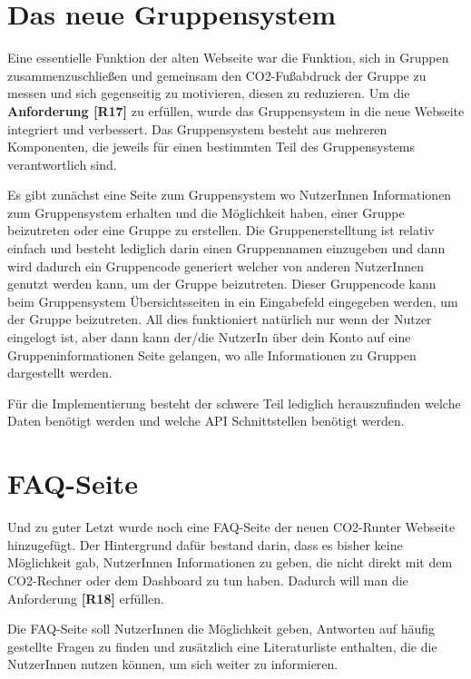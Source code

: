 \section{Das neue Gruppensystem}

Eine essentielle Funktion der alten Webseite war die Funktion, sich in Gruppen zusammenzuschließen und gemeinsam den CO2-Fußabdruck der Gruppe zu messen und sich gegenseitig zu motivieren, diesen zu reduzieren. Um die \textbf{Anforderung [R17]} zu erfüllen, wurde das Gruppensystem in die neue Webseite integriert und verbessert. Das Gruppensystem besteht aus mehreren Komponenten, die jeweils für einen bestimmten Teil des Gruppensystems verantwortlich sind.

Es gibt zunächst eine Seite zum Gruppensystem wo NutzerInnen Informationen zum Gruppensystem erhalten und die Möglichkeit haben, einer Gruppe beizutreten oder eine Gruppe zu erstellen. Die Gruppenerstelltung ist relativ einfach und besteht lediglich darin einen Gruppennamen einzugeben und dann wird dadurch ein Gruppencode generiert welcher von anderen NutzerInnen genutzt werden kann, um der Gruppe beizutreten. Dieser Gruppencode kann beim Gruppensystem Übersichtsseiten in ein Eingabefeld eingegeben werden, um der Gruppe beizutreten. All dies funktioniert natürlich nur wenn der Nutzer eingelogt ist, aber dann kann der/die NutzerIn über dein Konto auf eine Gruppeninformationen Seite gelangen, wo alle Informationen zu Gruppen dargestellt werden.

Für die Implementierung besteht der schwere Teil lediglich herauszufinden welche Daten benötigt werden und welche \acs{API} Schnittstellen benötigt werden.



\section{FAQ-Seite}

Und zu guter Letzt wurde noch eine FAQ-Seite der neuen CO2-Runter Webseite hinzugefügt. Der Hintergrund dafür bestand darin, dass es bisher keine Möglichkeit gab, NutzerInnen Informationen zu geben, die nicht direkt mit dem CO2-Rechner oder dem Dashboard zu tun haben. Dadurch will man die Anforderung \textbf{[R18]} erfüllen.

Die FAQ-Seite soll NutzerInnen die Möglichkeit geben, Antworten auf häufig gestellte Fragen zu finden und zusätzlich eine Literaturliste enthalten, die die NutzerInnen nutzen können, um sich weiter zu informieren.

